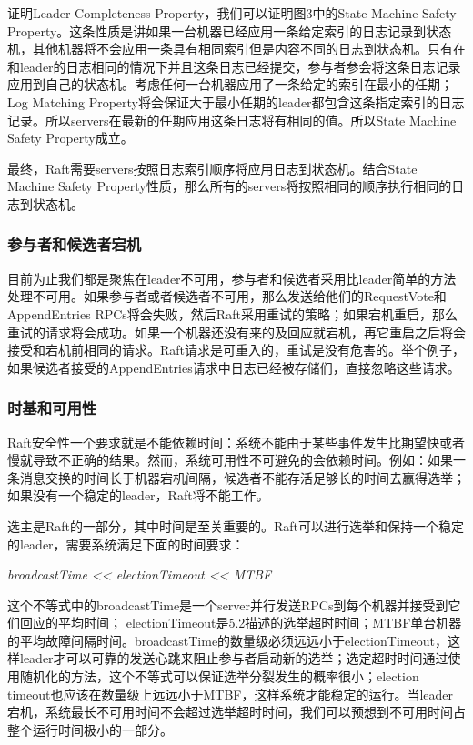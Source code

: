 \documentclass[journal]{IEEEtran}
\begin{document}
证明Leader Completeness Property，我们可以证明图3中的State Machine Safety Property。这条性质是讲如果一台机器已经应用一条给定索引的日志记录到状态机，其他机器将不会应用一条具有相同索引但是内容不同的日志到状态机。只有在和leader的日志相同的情况下并且这条日志已经提交，参与者参会将这条日志记录应用到自己的状态机。考虑任何一台机器应用了一条给定的索引在最小的任期；Log Matching Property将会保证大于最小任期的leader都包含这条指定索引的日志记录。所以servers在最新的任期应用这条日志将有相同的值。所以State Machine Safety Property成立。

最终，Raft需要servers按照日志索引顺序将应用日志到状态机。结合State Machine Safety Property性质，那么所有的servers将按照相同的顺序执行相同的日志到状态机。


\subsubsection{参与者和候选者宕机}
目前为止我们都是聚焦在leader不可用，参与者和候选者采用比leader简单的方法处理不可用。如果参与者或者候选者不可用，那么发送给他们的RequestVote和AppendEntries RPCs将会失败，然后Raft采用重试的策略；如果宕机重启，那么重试的请求将会成功。如果一个机器还没有来的及回应就宕机，再它重启之后将会接受和宕机前相同的请求。Raft请求是可重入的，重试是没有危害的。举个例子，如果候选者接受的AppendEntries请求中日志已经被存储们，直接忽略这些请求。

\subsubsection{时基和可用性}
Raft安全性一个要求就是不能依赖时间：系统不能由于某些事件发生比期望快或者慢就导致不正确的结果。然而，系统可用性不可避免的会依赖时间。例如：如果一条消息交换的时间长于机器宕机间隔，候选者不能存活足够长的时间去赢得选举；如果没有一个稳定的leader，Raft将不能工作。

选主是Raft的一部分，其中时间是至关重要的。Raft可以进行选举和保持一个稳定的leader，需要系统满足下面的时间要求：
\begin{center}
\textit{broadcastTime <<  electionTimeout  << MTBF} 
\end{center}
这个不等式中的broadcastTime是一个server并行发送RPCs到每个机器并接受到它们回应的平均时间；
 electionTimeout是5.2描述的选举超时时间；MTBF单台机器的平均故障间隔时间。broadcastTime的数量级必须远远小于electionTimeout，这样leader才可以可靠的发送心跳来阻止参与者启动新的选举；选定超时时间通过使用随机化的方法，这个不等式可以保证选举分裂发生的概率很小；election timeout也应该在数量级上远远小于MTBF，这样系统才能稳定的运行。当leader 宕机，系统最长不可用时间不会超过选举超时时间，我们可以预想到不可用时间占整个运行时间极小的一部分。
 
\end{document}
